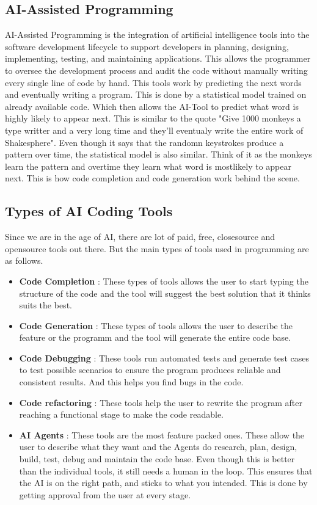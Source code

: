 \documentclass[12pt, a4paper]{article}
\begin{document}
\subsection{AI-Assisted Programming}
AI-Assisted Programming is the integration of artificial intelligence tools into the software development lifecycle to support developers in planning, designing, implementing, testing, and maintaining applications.
This allows the programmer to oversee the development process and audit the code without manually writing every single line of code by hand. This tools work by predicting the next words and eventually writing a program. This is done by a statistical model trained on already available code. Which then allows the AI-Tool to predict what word is highly likely to appear next.
This is similar to the quote "Give 1000 monkeys a type writter and a very long time and they'll eventualy write the entire work of Shakesphere". Even though it says that the randomn keystrokes produce a pattern over time, the statistical model is also similar. Think of it as the monkeys learn the pattern and overtime they learn what word is mostlikely to appear next. This is how code completion and code generation work behind the scene.

\subsection{Types of AI Coding Tools}
Since we are in the age of AI, there are lot of paid, free, closesource and opensource tools out there. But the main types of tools used in programming are as follows.
\begin{itemize}
    \item \textbf{Code Completion} : These types of tools allows the user to start typing the structure of the code and the tool will suggest the best solution that it thinks suits the best.
    \item \textbf{Code Generation} : These types of tools allows the user to describe the feature or the programm and the tool will generate the entire code base.
    \item \textbf{Code Debugging} : These tools run automated tests and generate test cases to test possible scenarios to ensure the program produces reliable and consistent results. And this helps you find bugs in the code.
    \item \textbf{Code refactoring} : These tools help the user to rewrite the program after reaching a functional stage to make the code readable.
    \item \textbf{AI Agents} : These tools are the most feature packed ones. These allow the user to describe what they want and the Agents do research, plan, design, build, test, debug and maintain the code base. Even though this is better than the individual tools, it still needs a human in the loop. This ensures that the AI is on the right path, and sticks to what you intended. This is done by getting approval from the user at every stage.
\end{itemize}
\end{document}
